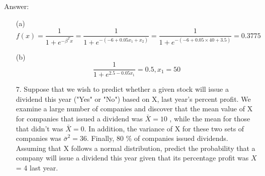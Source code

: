\documentclass[12pt,a4paper]{article}%
\theoremstyle{definition}
\theoremstyle{plain}
\numberwithin{equation}{section}
\begin{document}
\begin{oframed}
Answer:
\begin{enumerate}
\item[(a)] $$ f(x) = \frac{1}{1+e^{-\beta^{T}x}} = \frac{1}{1+e^{-(-6 + 0.05x_{1} + x_{2})}} = \frac{1}{1+e^{-(-6 + 0.05 \times 40 + 3.5)}}=0.3775 $$
\item[(b)] $$ \frac{1}{1+e^{2.5 - 0.05 x_{1}}} = 0.5, x_{1} = 50 $$
\end{enumerate}
\end{oframed}
\begin{enumerate}
\item[7.] Suppose that we wish to predict whether a given stock will issue a dividend this year ("Yes" or "No") based on X, last year's percent profit. 
We examine a large number of companies and discover that the mean value of X for companies that issued a dividend was
$\bar{X}= 10$ , while the mean for those that didn't was $\bar{X}= 0$. 
In addition, the variance of X for these two sets of companies was $\bar{\sigma}^{2}= 36$.
Finally, 80 \% of companies issued dividends. 
Assuming that X follows a normal distribution, predict the probability that a company will issue a dividend this year given that its percentage profit was $X$ = 4 last year.
\end{enumerate}
\end{document}
